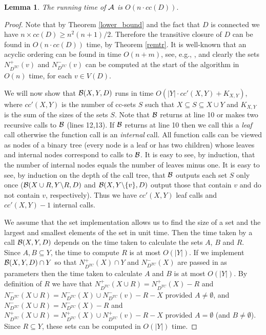 \documentclass[11pt]{article}
\newcommand{\2}{\vspace{0.2 cm}}
\newtheorem{lemma}[theorem]{Lemma}
\begin{document}
\begin{lemma}\label{runtlem}
The running time of $\cal A$ is $O(n\cdot cc(D)).$
\end{lemma}
\begin{proof} Note that by Theorem \ref{lower_bound} and the fact that $D$ is
connected we have $n \times cc(D) \geq n^2(n+1)/2$. Therefore the
transitive closure of $D$ can be found in $O(n \cdot cc(D))$ time,
by Theorem \ref{remtr}. It is well-known that an acyclic ordering can
be found in time $O(n+m)$, see, e.g., \cite{bang2000}, and clearly
the sets $N^+_{D^{TC}}(v)$ and $N^-_{D^{TC}}(v)$ can be computed at
the start of the algorithm in $O(n)$ time, for each $v\in V(D)$.


We will now show that ${\cal B}(X,Y,D)$ runs in time $O(|Y| \cdot
cc'(X,Y)+K_{X,Y})$, where $cc'(X,Y)$ is the number of cc-sets $S$
such that $X \subseteq S \subseteq X \cup Y$ and $K_{X,Y}$ is the
sum of the sizes of the sets $S$. Note that ${\cal B}$ returns at
line 10 or makes two recursive calls to ${\cal B}$ (lines 12,13). If
${\cal B}$ returns at line 10 then we call this a {\em leaf} call
otherwise the function call is an {\em internal} call. All function
calls can be viewed as nodes of a binary tree (every node is a leaf
or has two children) whose leaves and internal nodes correspond to
calls to $\cal B$. It is easy to see, by induction, that the number
of internal nodes equals the number of leaves minus one. It is easy
to see, by induction on the depth of the call tree, that ${\cal B}$
outputs each set $S$ only once (${\cal B}(X\cup R,Y\backslash R,D)$
and ${\cal B}(X,Y\backslash\{v\},D)$ output those that contain $v$
and do not contain $v$, respectively). Thus we have $cc'(X,Y)$ leaf
calls and $cc'(X,Y)-1$ internal calls.

We assume that the set implementation allows us to find the size of
a set and the largest and smallest elements of the set in unit time.
Then the time taken by a call  ${\cal B}(X,Y,D)$ depends on the time
taken to calculate the sets $A$, $B$ and $R$. Since $A,B\subseteq
Y$, the time to compute $R$ is at most $O(|Y|)$. If we implement
${\cal B}(X,Y,D)\cap Y$ so that $N^+_{D^{TC}}(X)\cap Y$ and $N^-_{D^{TC}}(X)$
are passed in as parameters then the time taken to calculate $A$ and
$B$ is at most $O(|Y|)$. By definition of $R$ we have that  $N^+_{D^{TC}}(X
\cup R) = N^+_{D^{TC}}(X) - R$ and $N^-_{D^{TC}}(X \cup R) = N^-_{D^{TC}}(X) \cup
N^-_{D^{TC}}(v) - R -
X$ provided $A \not= \emptyset$, and $N^-_{D^{TC}}(X \cup R) = N^-_{D^{TC}}(X) - R$
and $N^+_{D^{TC}}(X \cup R) = N^+_{D^{TC}}(X) \cup N^+_{D^{TC}}(v) - R - X$ provided
$A=\emptyset$ (and $B \not= \emptyset$). Since $R\subseteq Y$, these
sets can be computed in $O(|Y|)$ time.


\end{proof}
\end{document}
